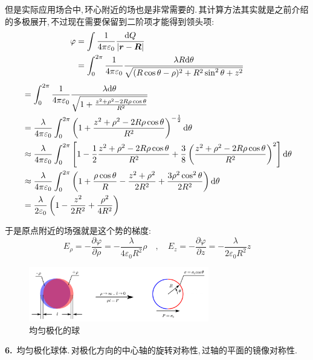 但是实际应用场合中,\,环心附近的场也是非常需要的.\,其计算方法其实就是之前介绍的多极展开,\,不过现在需要保留到二阶项才能得到领头项:
\begin{align*}
\varphi  	&= \int \frac{1}{4\pi\varepsilon_0} \frac{\textrm{d} Q}{|\boldsymbol{r}-\boldsymbol{R}|}\\
				&= \int_0^{2\pi} \frac{1}{4\pi\varepsilon_0} \frac{\lambda R\textrm{d} \theta}{\sqrt{(R\cos\theta -\rho)^2+ R^2\sin^2 \theta +z^2}}\\
				\end{align*}
				\begin{align*}
				&= \int_0^{2\pi} \frac{1}{4\pi\varepsilon_0} \frac{\lambda \textrm{d} \theta}{\sqrt{1+\frac{z^2+\rho^2-2R\rho\cos\theta}{R^2}}}\\
				&= \frac{\lambda}{4\pi\varepsilon_0}\int_0^{2\pi} \left(1+\frac{z^2+\rho^2-2R\rho\cos\theta}{R^2}\right)^{-\frac{1}{2}}\textrm{d} \theta\\
				&\approx \frac{\lambda}{4\pi\varepsilon_0}\int_0^{2\pi} \left[1-\frac{1}{2}\frac{z^2+\rho^2-2R\rho\cos\theta}{R^2}+\frac{3}{8}\left( \frac{z^2+\rho^2-2R\rho\cos\theta}{R^2} \right)^2 \right]\textrm{d} \theta\\
				&\approx \frac{\lambda}{4\pi\varepsilon_0}\int_0^{2\pi} \left(1+\frac{\rho\cos\theta}{R}-\frac{z^2+\rho^2}{2R^2}+\frac{3\rho^2\cos^2\theta}{2R^2} \right)\textrm{d} \theta\\
				&= \frac{\lambda}{2\varepsilon_0}\left(1-\frac{z^2}{2R^2}+\frac{\rho^2}{4R^2} \right)\\
\end{align*}

于是原点附近的场强就是这个势的梯度:
\[E_\rho=-\frac{\partial \varphi}{\partial \rho}=-\frac{\lambda}{4\varepsilon_0 R^2}\rho \quad,\quad E_z=-\frac{\partial \varphi}{\partial z}=-\frac{\lambda}{2\varepsilon_0 R^2}z\]

\begin{figure}[H]
\centering
\includegraphics[width=0.7\textwidth]{image/7-1-21.png}
\caption{均匀极化的球}\label{fig7-1-21}
\end{figure}

\textbf{6.}\, 均匀极化球体.\,对极化方向的中心轴的旋转对称性,\,过轴的平面的镜像对称性.

